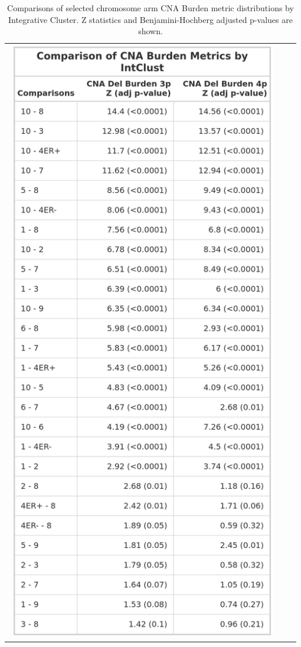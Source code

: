 \begin{table}[!htb]
\caption[Comparisons of selected chromosome arm CNA Burden metric distributions by Integrative Cluster.]{Comparisons of selected chromosome arm CNA Burden metric distributions by Integrative Cluster. Z statistics and Benjamini-Hochberg adjusted p-values are shown.}
\begin{minipage}[c]{0.45\textwidth}
\centering
\begin{tabular}{ccc}
\includegraphics[width=0.98\textwidth]{../tables/Chapter_2/ChrArm_CNA_Burden_Metric_Comparisons_IC_1.png}

\end{tabular}
\end{minipage}
\end{table}
